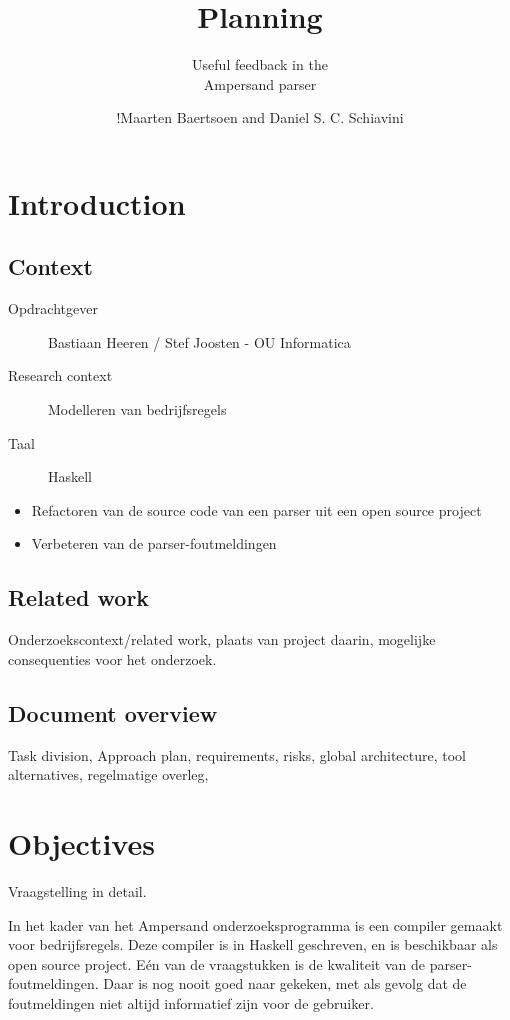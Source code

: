 \documentclass[a4paper,12pt,abstracton,titlepage]{scrartcl}
\author{!Maarten Baertsoen and Daniel S. C. Schiavini}
\affil{Open Universiteit Nederland, faculteit Informatica \\
	T61327 - Afstudeerproject bachelor informatica}
\title{Planning}
\subtitle{Useful feedback in the\\ Ampersand parser}
\begin{document}
\maketitle
\newpage

\tableofcontents
\clearpage

\section{Introduction}
\subsection{Context}
\begin{description}
\item [Opdrachtgever] Bastiaan Heeren / Stef Joosten - OU Informatica
\item [Research context] Modelleren van bedrijfsregels
\item [Taal] Haskell
\end{description}

\begin{itemize}
\item Refactoren van de source code van een parser uit een open source project 
\item Verbeteren van de parser-foutmeldingen
\end{itemize}

\subsection{Related work}
Onderzoekscontext/related work, plaats van project daarin, mogelijke consequenties voor het onderzoek.

\subsection{Document overview}
\lipsum[1]

Task division, Approach plan, requirements, risks, global architecture, tool alternatives,
regelmatige overleg,


\newpage
\section{Objectives}
Vraagstelling in detail.

In het kader van het Ampersand onderzoeksprogramma is een compiler gemaakt voor bedrijfsregels. Deze compiler is in Haskell geschreven, en is beschikbaar als open source project. Eén van de vraagstukken is de kwaliteit van de parser-foutmeldingen. Daar is nog nooit goed naar gekeken, met als gevolg dat de foutmeldingen niet altijd informatief zijn voor de gebruiker.
\end{document}
